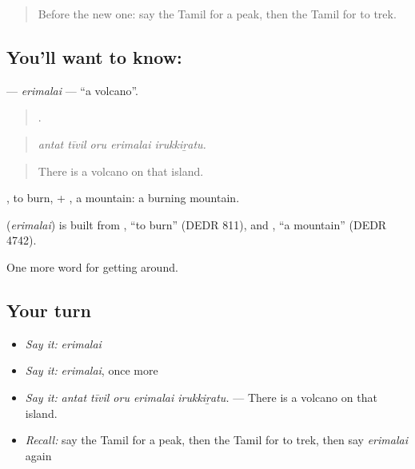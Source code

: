\label{lesson:TA-C433-erimalai}



\begin{quote}
Before the new one: say the Tamil for a peak, then the Tamil for to trek.
\end{quote}

\subsection*{You'll want to know: }
\textbf{} — \emph{erimalai} — \textquotedblleft{}a volcano\textquotedblright{}.

\begin{quote}
    .
\end{quote}

\begin{quote}
\emph{antat tīvil oru erimalai irukkiṟatu.}
\end{quote}

\begin{quote}
There is a volcano on that island.
\end{quote}

, to burn, + , a mountain: a burning mountain.

\begin{cousinweb}
\textbf{} (\emph{erimalai}) is built from , \textquotedblleft{}to burn\textquotedblright{} (DEDR 811), and , \textquotedblleft{}a mountain\textquotedblright{} (DEDR 4742).
\end{cousinweb}

\begin{grammarlens}[title={What you've built}]
One more word for getting around.
\end{grammarlens}

\subsection*{Your turn}
\begin{itemize}
\raggedright
  \item \emph{Say it:} \emph{erimalai}
  \item \emph{Say it:} \emph{erimalai}, once more
  \item \emph{Say it:} \emph{antat tīvil oru erimalai irukkiṟatu.} — There is a volcano on that island.
  \item \emph{Recall:} say the Tamil for a peak, then the Tamil for to trek, then say \emph{erimalai} again
\end{itemize}

